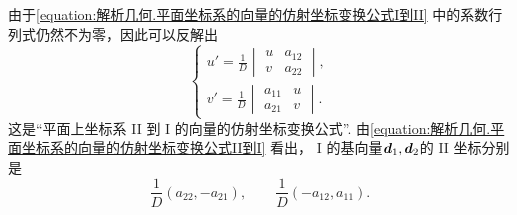 由于\cref{equation:解析几何.平面坐标系的向量的仿射坐标变换公式I到II}
中的系数行列式仍然不为零，因此可以反解出
\begin{equation}\label{equation:解析几何.平面坐标系的向量的仿射坐标变换公式II到I}
	\left\{ \begin{array}{l}
		u' = \frac{1}{D} \begin{vmatrix}
			u & a_{12} \\
			v & a_{22}
		\end{vmatrix}, \\
		v' = \frac{1}{D} \begin{vmatrix}
			a_{11} & u \\
			a_{21} & v
		\end{vmatrix}.
	\end{array} \right.
\end{equation}
这是“平面上坐标系 II 到 I 的向量的仿射坐标变换公式”.
由\cref{equation:解析几何.平面坐标系的向量的仿射坐标变换公式II到I} 看出，
I 的基向量\(\boldsymbol{d}_1,\boldsymbol{d}_2\)的 II 坐标分别是\begin{equation*}
	\frac{1}{D} (a_{22},-a_{21}), \qquad
	\frac{1}{D} (-a_{12},a_{11}).
\end{equation*}
